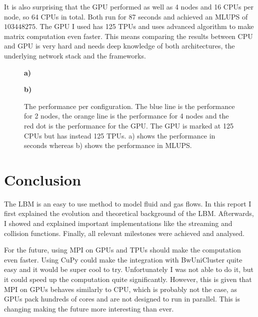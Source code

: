 It is also surprising that the GPU performed as well as 4 nodes and 16 CPUs per node, so 64 CPUs in total. 
Both run for 87 seconds and achieved an MLUPS of $103448275$.
The GPU I used has 125 TPUs and uses advanced algorithm to make matrix computation even faster. This means comparing the results between CPU and GPU is very hard and needs deep knowledge of both architectures, the underlying network stack and the frameworks.
\begin{figure}[ht]
\centering
\textbf{\large a)} \\
\resizebox{0.7\columnwidth}{!}{\large}
\vspace*{2mm}

\textbf{\large b)} \\
\resizebox{0.7\columnwidth}{!}{\large}
\caption[Performance per configuration.]{The performance per configuration. The blue line is the performance for 2 nodes, the orange line is the performance for 4 nodes and the red dot is the performance for the GPU. The GPU is marked at 125 CPUs but has instead 125 TPUs.
a) shows the performance in seconds whereas b) shows the performance in MLUPS.}
\label{fig:m7}
\end{figure}



\chapter{Conclusion}
The LBM is an easy to use method to model fluid and gas flows. In this report I first explained the evolution and theoretical background of the LBM. 
Afterwards, I showed and explained important implementations like the streaming and collision functions.
Finally, all relevant milestones were achieved and analysed.

For the future, using MPI on GPUs and TPUs should make the computation even faster.
Using CuPy could make the integration with BwUniCluster quite easy and it would be super cool to try. Unfortunately I was not able to do it, but it could speed up the computation quite significantly.
However, this is given that MPI on GPUs behaves similarly to CPU, which is probably not the case, as GPUs pack hundreds of cores and are not designed to run in parallel. 
This is changing making the future more interesting than ever.



